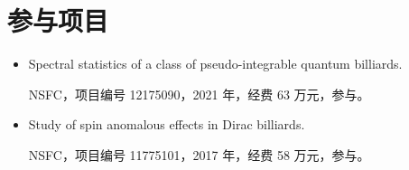 \documentclass[11pt,a4paper]{article}
\begin{document}
\section{参与项目}
\begin{itemize}
\item Spectral statistics of a class of pseudo-integrable quantum billiards.\par
NSFC，项目编号 12175090，2021 年，经费 63 万元，参与。
\item Study of spin anomalous effects in Dirac billiards.\par
NSFC，项目编号 11775101，2017 年，经费 58 万元，参与。
\end{itemize}
\end{document}
